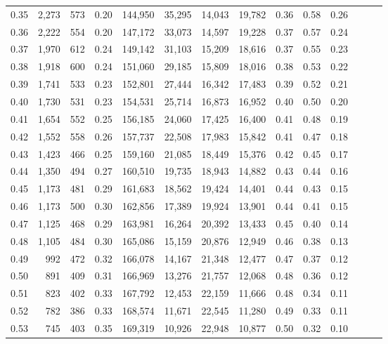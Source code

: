 \begin{tabular}{rrrrrrrrrrrrrr}
0.35 &  2,273 &  573 &  0.20 &  144,950 &   35,295 &  14,043 &  19,782 &  0.36 &  0.58 &      0.26 \\
0.36 &  2,222 &  554 &  0.20 &  147,172 &   33,073 &  14,597 &  19,228 &  0.37 &  0.57 &      0.24 \\
0.37 &  1,970 &  612 &  0.24 &  149,142 &   31,103 &  15,209 &  18,616 &  0.37 &  0.55 &      0.23 \\
0.38 &  1,918 &  600 &  0.24 &  151,060 &   29,185 &  15,809 &  18,016 &  0.38 &  0.53 &      0.22 \\
0.39 &  1,741 &  533 &  0.23 &  152,801 &   27,444 &  16,342 &  17,483 &  0.39 &  0.52 &      0.21 \\
0.40 &  1,730 &  531 &  0.23 &  154,531 &   25,714 &  16,873 &  16,952 &  0.40 &  0.50 &      0.20 \\
0.41 &  1,654 &  552 &  0.25 &  156,185 &   24,060 &  17,425 &  16,400 &  0.41 &  0.48 &      0.19 \\
0.42 &  1,552 &  558 &  0.26 &  157,737 &   22,508 &  17,983 &  15,842 &  0.41 &  0.47 &      0.18 \\
0.43 &  1,423 &  466 &  0.25 &  159,160 &   21,085 &  18,449 &  15,376 &  0.42 &  0.45 &      0.17 \\
0.44 &  1,350 &  494 &  0.27 &  160,510 &   19,735 &  18,943 &  14,882 &  0.43 &  0.44 &      0.16 \\
0.45 &  1,173 &  481 &  0.29 &  161,683 &   18,562 &  19,424 &  14,401 &  0.44 &  0.43 &      0.15 \\
0.46 &  1,173 &  500 &  0.30 &  162,856 &   17,389 &  19,924 &  13,901 &  0.44 &  0.41 &      0.15 \\
0.47 &  1,125 &  468 &  0.29 &  163,981 &   16,264 &  20,392 &  13,433 &  0.45 &  0.40 &      0.14 \\
0.48 &  1,105 &  484 &  0.30 &  165,086 &   15,159 &  20,876 &  12,949 &  0.46 &  0.38 &      0.13 \\
0.49 &    992 &  472 &  0.32 &  166,078 &   14,167 &  21,348 &  12,477 &  0.47 &  0.37 &      0.12 \\
0.50 &    891 &  409 &  0.31 &  166,969 &   13,276 &  21,757 &  12,068 &  0.48 &  0.36 &      0.12 \\
0.51 &    823 &  402 &  0.33 &  167,792 &   12,453 &  22,159 &  11,666 &  0.48 &  0.34 &      0.11 \\
0.52 &    782 &  386 &  0.33 &  168,574 &   11,671 &  22,545 &  11,280 &  0.49 &  0.33 &      0.11 \\
0.53 &    745 &  403 &  0.35 &  169,319 &   10,926 &  22,948 &  10,877 &  0.50 &  0.32 &      0.10 \\

\end{tabular}
